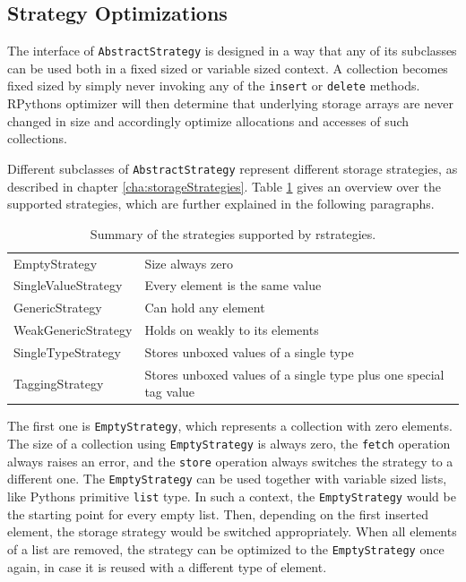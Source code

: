 \subsection{Strategy Optimizations}
\label{sec:solutionOptimizations}

The interface of \lstinline{AbstractStrategy} is designed in a way that any of its subclasses can be used both in a fixed sized or variable sized context.
A collection becomes fixed sized by simply never invoking any of the \lstinline{insert} or \lstinline{delete} methods.
RPythons optimizer will then determine that underlying storage arrays are never changed in size and accordingly optimize allocations and accesses of such collections.

Different subclasses of \lstinline{AbstractStrategy} represent different storage strategies, as described in chapter \ref{cha:storageStrategies}.
Table \ref{tab:strategiesOverwiew} gives an overview over the supported strategies, which are further explained in the following paragraphs.

\begin{table}
\centering

\begin{tabular}[ht]{ l l }
\toprule
EmptyStrategy & Size always zero \\
SingleValueStrategy & Every element is the same value \\
GenericStrategy & Can hold any element \\
WeakGenericStrategy & Holds on weakly to its elements \\
SingleTypeStrategy & Stores unboxed values of a single type \\
TaggingStrategy & Stores unboxed values of a single type plus one special tag value \\
\bottomrule
\end{tabular}

\caption{Summary of the strategies supported by rstrategies.}
\label{tab:strategiesOverwiew}
\end{table}


The first one is \lstinline{EmptyStrategy}, which represents a collection with zero elements.
The size of a collection using \lstinline{EmptyStrategy} is always zero, the \lstinline{fetch} operation always raises an error, and the \lstinline{store} operation always switches the strategy to a different one.
The \lstinline{EmptyStrategy} can be used together with variable sized lists, like Pythons primitive \lstinline{list} type.
In such a context, the \lstinline{EmptyStrategy} would be the starting point for every empty list.
Then, depending on the first inserted element, the storage strategy would be switched appropriately.
When all elements of a list are removed, the strategy can be optimized to the \lstinline{EmptyStrategy} once again, in case it is reused with a different type of element.

